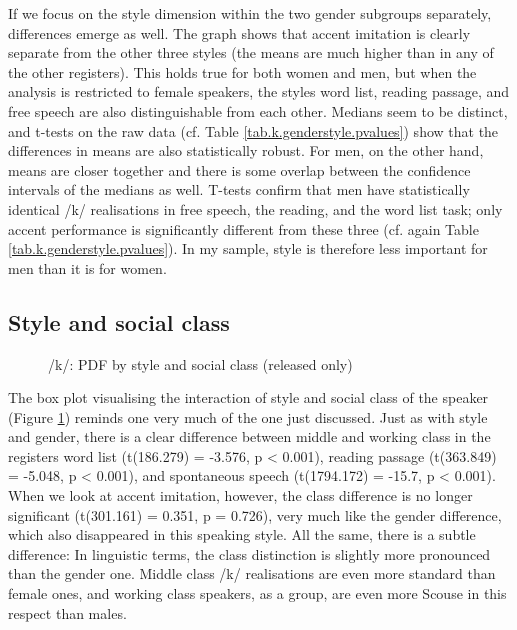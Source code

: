 If we focus on the style dimension within the two gender subgroups separately, differences emerge as well.
The graph shows that accent imitation is clearly separate from the other three styles (the means are much higher than in any of the other registers).
This holds true for both women and men, but when the analysis is restricted to female speakers, the styles word list, reading passage, and free speech are also distinguishable from each other.
Medians seem to be distinct, and t-tests on the raw data (cf. Table \ref{tab.k.genderstyle.pvalues}) show that the differences in means are also statistically robust.
For men, on the other hand, means are closer together and there is some overlap between the confidence intervals of the medians as well.
T-tests confirm that men have statistically identical /k/ realisations in free speech, the reading, and the word list task; only accent performance is significantly different from these three (cf. again Table \ref{tab.k.genderstyle.pvalues}).
In my sample, style is therefore less important for men than it is for women.

\subsection{Style and social class}
\label{sec.prod.res.con.k.styleclass}

\begin{figure}[h]
	\centering
		\resizebox{0.49\linewidth}{!}{} 
	\caption{/k/: PDF by style and social class (released only)}
	\label{fig.box.k.styleclass}
\end{figure}

The box plot visualising the interaction of style and social class of the speaker (Figure \ref{fig.box.k.styleclass}) reminds one very much of the one just discussed.
Just as with style and gender, there is a clear difference between middle and working class in the registers word list (t(186.279) = -3.576, p < 0.001), reading passage (t(363.849) = -5.048, p < 0.001), and spontaneous speech (t(1794.172) = -15.7, p < 0.001).
When we look at accent imitation, however, the class difference is no longer significant (t(301.161) = 0.351, p = 0.726), very much like the gender difference, which also disappeared in this speaking style.
All the same, there is a subtle difference: In linguistic terms, the class distinction is slightly more pronounced than the gender one.
Middle class /k/ realisations are even more standard than female ones, and working class speakers, as a group, are even more Scouse in this respect than males.

